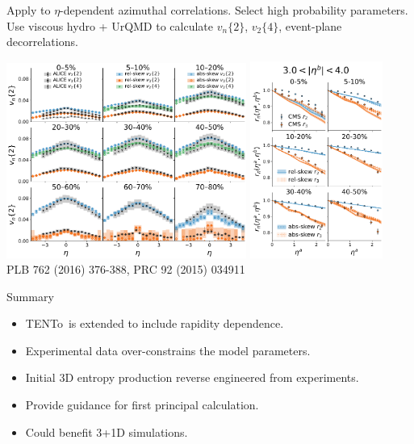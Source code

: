 \documentclass[11pt]{beamer}
\newcommand{\TRENTo}{T\raisebox{-0.2em}{R}ENTo~}
\begin{document}
\begin{frame}{Apply to $\eta$-dependent azimuthal correlations.}
Select high probability parameters. Use viscous hydro + UrQMD to calculate $v_n\{2\}$, $v_2\{4\}$, event-plane decorrelations.
\begin{center}
\includegraphics[width=0.59\textwidth]{vn_eta.pdf}\quad
\includegraphics[width=0.325\textwidth]{evt_pln_decorr_near.pdf}\\
\tiny PLB 762 (2016) 376-388, PRC 92 (2015) 034911
\end{center}
\end{frame}

\begin{frame}{Summary}
\begin{itemize}
\item \TRENTo is extended to include rapidity dependence.
\vspace*{0.5cm}
\item Experimental data over-constrains the model parameters.
\vspace*{0.5cm}
\item \colorbox{red!20}{Initial 3D entropy production reverse engineered
 from experiments.}
\vspace*{0.5cm}
\item \colorbox{blue!20}{Provide guidance for first principal calculation.}
\vspace*{0.5cm}
\item \colorbox{blue!20}{Could benefit 3+1D simulations.}
\end{itemize}
\end{frame}
\end{document}
